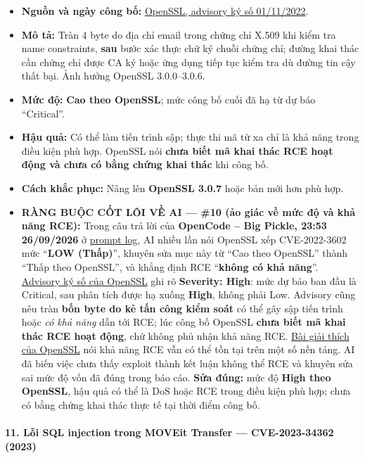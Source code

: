 \begin{itemize}
\tightlist
\item
  \textbf{Nguồn và ngày công bố:} \href{https://mta.openssl.org/pipermail/openssl-project/2022-November/003047.html}{OpenSSL, advisory ký số 01/11/2022}.
\item
  \textbf{Mô tả:} Tràn 4 byte do địa chỉ email trong chứng chỉ X.509 khi kiểm tra name constraints, \textbf{sau} bước xác thực chữ ký chuỗi chứng chỉ; đường khai thác cần chứng chỉ được CA ký hoặc ứng dụng tiếp tục kiểm tra dù đường tin cậy thất bại. Ảnh hưởng OpenSSL 3.0.0--3.0.6.
\item
  \textbf{Mức độ:} \textbf{Cao theo OpenSSL}; mức công bố cuối đã hạ từ dự báo ``Critical''.
\item
  \textbf{Hậu quả:} Có thể làm tiến trình sập; thực thi mã từ xa chỉ là khả năng trong điều kiện phù hợp. OpenSSL nói \textbf{chưa biết mã khai thác RCE hoạt động và chưa có bằng chứng khai thác} khi công bố.
\item
  \textbf{Cách khắc phục:} Nâng lên \textbf{OpenSSL 3.0.7} hoặc bản mới hơn phù hợp.
\item
  \textbf{RÀNG BUỘC CỐT LÕI VỀ AI --- \#10 (ảo giác về mức độ và khả năng RCE):} Trong câu trả lời của \textbf{OpenCode -- Big Pickle, 23:53 26/09/2026} ở \href{Appendix_A_Prompt_Log.md}{prompt log}, AI nhiều lần nói OpenSSL xếp CVE-2022-3602 mức ``\textbf{LOW (Thấp)}'', khuyên sửa mục này từ ``Cao theo OpenSSL'' thành ``Thấp theo OpenSSL'', và khẳng định RCE ``\textbf{không có khả năng}''. \href{https://mta.openssl.org/pipermail/openssl-project/2022-November/003047.html}{Advisory ký số của OpenSSL} ghi rõ \textbf{Severity: High}: mức dự báo ban đầu là Critical, sau phân tích được hạ xuống \textbf{High}, không phải Low. Advisory cũng nêu tràn \textbf{bốn byte do kẻ tấn công kiểm soát} có thể gây sập tiến trình hoặc \emph{có khả năng} dẫn tới RCE; lúc công bố OpenSSL \textbf{chưa biết mã khai thác RCE hoạt động}, chứ không phủ nhận khả năng RCE. \href{https://mirror.openssl-library.org/post/2022-11-01-email-address-overflows/}{Bài giải thích của OpenSSL} nói khả năng RCE vẫn có thể tồn tại trên một số nền tảng. AI đã biến việc chưa thấy exploit thành kết luận không thể RCE và khuyên sửa sai mức độ vốn đã đúng trong báo cáo. \textbf{Sửa đúng:} mức độ \textbf{High theo OpenSSL}, hậu quả có thể là DoS hoặc RCE trong điều kiện phù hợp; chưa có bằng chứng khai thác thực tế tại thời điểm công bố.
\end{itemize}

\paragraph{11. Lỗi SQL injection trong MOVEit Transfer --- CVE-2023-34362 (2023)}\label{lux1ed7i-sql-injection-trong-moveit-transfer-cve-2023-34362-2023}

